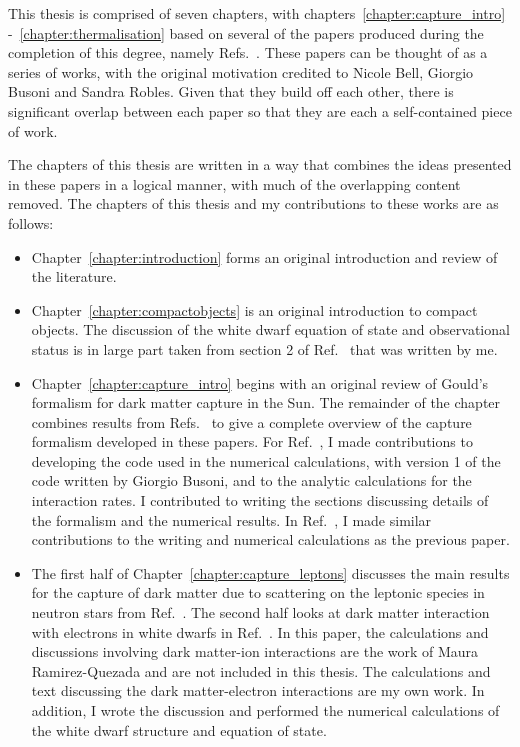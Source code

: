 \begin{preface}


This thesis is comprised of seven chapters, with chapters~\ref{chapter:capture_intro} -~\ref{chapter:thermalisation} based on several of the papers produced during the completion of this degree, namely Refs.~\cite{Bell:2020jou_sep_ImprovedTreatmentDark, Bell:2020lmm_mar_ImprovedTreatmentDark, Bell:2021fye_oct_Improvedtreatmentdark, Anzuini:2021lnv_nov_Improvedtreatmentdark, Bell:2023ysh_dec_ThermalizationAnnihilationDark}. These papers can be thought of as a series of works, with the original motivation credited to Nicole Bell, Giorgio Busoni and Sandra Robles. Given that they build off each other, there is significant overlap between each paper so that they are each a self-contained piece of work.

The chapters of this thesis are written in a way that combines the ideas presented in these papers in a logical manner, with much of the overlapping content removed. 
The chapters of this thesis and my contributions to these works are as follows:
\begin{itemize}
    \item Chapter~\ref{chapter:introduction} forms an original introduction and review of the literature.
    \item Chapter~\ref{chapter:compactobjects} is an original introduction to compact objects. The discussion of the white dwarf equation of state and observational status is in large part taken from section 2 of Ref.~\cite{Bell:2021fye_oct_Improvedtreatmentdark} that was written by me.
    \item Chapter~\ref{chapter:capture_intro} begins with an original review of Gould's formalism for dark matter capture in the Sun. The remainder of the chapter combines results from Refs.~\cite{Bell:2020jou_sep_ImprovedTreatmentDark, Bell:2020lmm_mar_ImprovedTreatmentDark} to give a complete overview of the capture formalism developed in these papers. For Ref.~\cite{Bell:2020jou_sep_ImprovedTreatmentDark}, I made contributions to developing the code used in the numerical calculations, with version 1 of the code written by Giorgio Busoni, and to the analytic calculations for the interaction rates. I contributed to writing the sections discussing details of the formalism and the numerical results. In Ref.~\cite{Bell:2020lmm_mar_ImprovedTreatmentDark}, I made similar contributions to the writing and numerical calculations as the previous paper.
    \item The first half of Chapter~\ref{chapter:capture_leptons} discusses the main results for the capture of dark matter due to scattering on the leptonic species in neutron stars from Ref.~\cite{Bell:2020lmm_mar_ImprovedTreatmentDark}. The second half looks at dark matter interaction with electrons in white dwarfs in Ref.~\cite{Bell:2021fye_oct_Improvedtreatmentdark}. In this paper, the calculations and discussions involving dark matter-ion interactions are the work of Maura Ramirez-Quezada and are not included in this thesis. The calculations and text discussing the dark matter-electron interactions are my own work. In addition, I wrote the discussion and performed the numerical calculations of the white dwarf structure and equation of state.

\end{itemize}
\end{preface}

